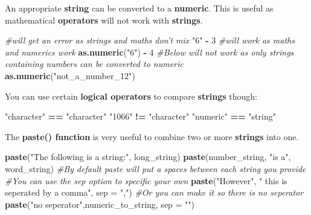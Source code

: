 \documentclass[]{book}
\newenvironment{Shaded}{\begin{snugshade}}{\end{snugshade}}
\newcommand{\KeywordTok}[1]{\textcolor[rgb]{0.13,0.29,0.53}{\textbf{#1}}}
\newcommand{\DataTypeTok}[1]{\textcolor[rgb]{0.13,0.29,0.53}{#1}}
\newcommand{\DecValTok}[1]{\textcolor[rgb]{0.00,0.00,0.81}{#1}}
\newcommand{\StringTok}[1]{\textcolor[rgb]{0.31,0.60,0.02}{#1}}
\newcommand{\CommentTok}[1]{\textcolor[rgb]{0.56,0.35,0.01}{\textit{#1}}}
\newcommand{\OperatorTok}[1]{\textcolor[rgb]{0.81,0.36,0.00}{\textbf{#1}}}
\newcommand{\NormalTok}[1]{#1}
\begin{document}
An appropriate \textbf{string} can be converted to a \textbf{numeric}.
This is useful as mathematical \textbf{operators} will not work with
\textbf{strings}.

\begin{Shaded}
\begin{Highlighting}[]
\CommentTok{#will get an error as strings and maths don't mix}
\StringTok{"6"} \OperatorTok{-}\StringTok{ }\DecValTok{3}
\CommentTok{#will work as maths and numerics work}
\KeywordTok{as.numeric}\NormalTok{(}\StringTok{"6"}\NormalTok{) }\OperatorTok{-}\StringTok{ }\DecValTok{4}
\CommentTok{#Below will not work as only strings containing numbers can be converted to numeric}
\KeywordTok{as.numeric}\NormalTok{(}\StringTok{"not_a_number_12"}\NormalTok{)}
\end{Highlighting}
\end{Shaded}

You can use certain \textbf{logical operators} to compare
\textbf{strings} though:

\begin{Shaded}
\begin{Highlighting}[]
\StringTok{"character"} \OperatorTok{==}\StringTok{ "character"}
\StringTok{"1066"} \OperatorTok{!=}\StringTok{ "character"}
\StringTok{"numeric"} \OperatorTok{==}\StringTok{ "string"}
\end{Highlighting}
\end{Shaded}

The \textbf{paste() function} is very useful to combine two or more
\textbf{strings} into one.

\begin{Shaded}
\begin{Highlighting}[]
\KeywordTok{paste}\NormalTok{(}\StringTok{"The following is a string:"}\NormalTok{, long_string) }
\KeywordTok{paste}\NormalTok{(number_string, }\StringTok{"is a"}\NormalTok{, word_string)}
\CommentTok{#By default paste will put a spaces between each string you provide}
\CommentTok{#You can use the sep option to specific your own}
\KeywordTok{paste}\NormalTok{(}\StringTok{"However"}\NormalTok{, }\StringTok{" this is seperated by a comma"}\NormalTok{, }\DataTypeTok{sep =} \StringTok{","}\NormalTok{)}
\CommentTok{#Or you can make it so there is no seperator}
\KeywordTok{paste}\NormalTok{(}\StringTok{"no seperator"}\NormalTok{,numeric_to_string, }\DataTypeTok{sep =} \StringTok{""}\NormalTok{)}
\end{Highlighting}
\end{Shaded}
\end{document}
